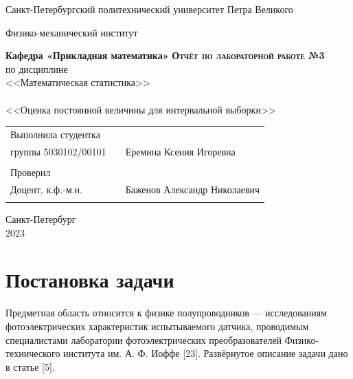 \documentclass{article}
\begin{document}
\begin{titlepage}
  \begin{center}
    \large
    Санкт-Петербургский политехнический университет Петра Великого
    
    Физико-механический институт
    
    \textbf{Кафедра «Прикладная математика»}
    \vfill
    \textsc{\textbf{\Large{Отчёт по лабораторной работе №3}}}\\
    по дисциплине\\ <<Математическая статистика>>\\[5mm]
    \\\Large{<<Оценка постоянной величины для интервальной выборки>>}\\
\end{center}

\vfill

\begin{tabular}{l p{} l}
Выполнила студентка \\группы 5030102/00101 && Еремина Ксения Игоревна \\
\\
Проверил\\Доцент, к.ф.-м.н.& \hspace{0pt} &   Баженов Александр Николаевич \\\\
\end{tabular}

\hfill \break
\hfill \break
\begin{center} Санкт-Петербург \\2023 \end{center}
\thispagestyle{empty}
\end{titlepage}
\newpage
\begin{center}
    \tableofcontents
\end{center}
\newpage
\begin{center}
    \listoffigures
\end{center}
\newpage
\section{Постановка задачи}
Предметная область относится к физике полупроводников — исследованиям фотоэлектрических характеристик испытываемого датчика, проводимым специалистами лаборатории фотоэлектрических преобразователей Физико-технического института им. А. Ф. Иоффе [23].
Развёрнутое описание задачи дано в статье [5].
\end{document}
